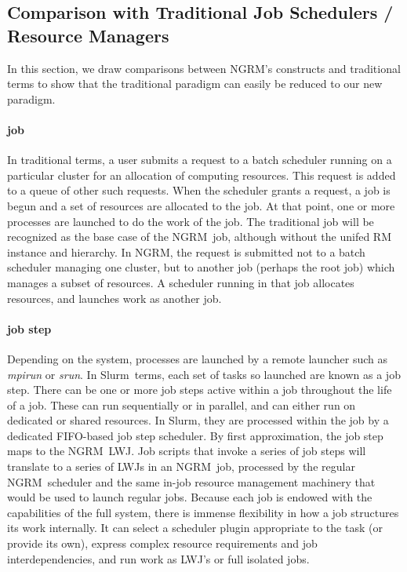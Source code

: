 \documentclass[10pt]{article}
\newcommand{\ngrm}{NGRM}
\newcommand{\slurm}{Slurm}
\begin{document}
\subsection{Comparison with Traditional Job Schedulers / Resource Managers}

In this section, we draw comparisons between \ngrm's constructs and traditional terms
to show that the traditional paradigm can easily be reduced to our new paradigm. 
\paragraph{job} In traditional terms, a user submits a request to a batch scheduler running on a particular cluster
for an allocation of computing resources.  This request is added to a
queue of other such requests.  When the scheduler grants a request, a
job is begun and a set of resources are allocated to the job.  At that
point, one or more processes are launched to do the work of the job.
The traditional job will be recognized as the base case of the \ngrm\ job,
although without the unifed RM instance and hierarchy. 
In \ngrm, the request is submitted not to a batch scheduler managing one
cluster, but to another job (perhaps the root job) which manages a subset
of resources.
A scheduler running in that job allocates resources, and launches work as
another job.

\paragraph{job step}
Depending on the system, processes are launched by a remote launcher such
as {\em mpirun} or {\em srun}.  In \slurm\ terms, each set of tasks so launched are
known as a job step.  There can be one or more job steps active within
a job throughout the life of a job.  These can run sequentially or in
parallel, and can either run on dedicated or shared resources.
In \slurm, they are processed within the job by a dedicated FIFO-based
job step scheduler.
By first approximation, the job step maps to the \ngrm\ LWJ. 
Job scripts that invoke a series of job steps will translate
to a series of LWJs in an \ngrm\ job, processed by the regular \ngrm\ scheduler
and the same in-job resource management machinery that would be used to
launch regular jobs.  Because each job is endowed with the capabilities
of the full system, there is immense flexibility in how a job structures
its work internally.  It can select a scheduler plugin appropriate to the
task (or provide its own), express complex resource requirements and job
interdependencies, and run work as LWJ's or full isolated jobs.
\end{document}
